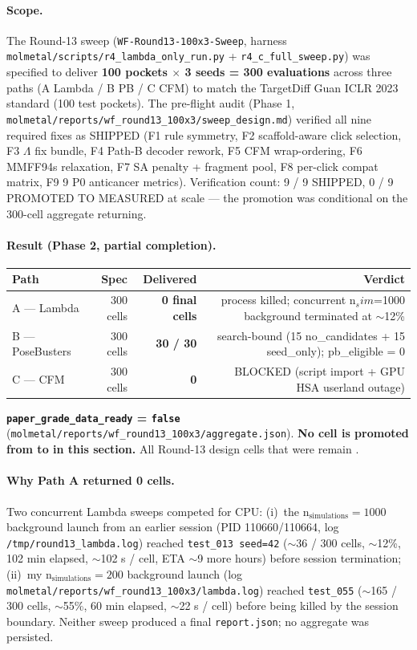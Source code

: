 {\paragraph{Scope.}
The Round-13 sweep (\texttt{WF-Round13-100x3-Sweep}, harness
\texttt{molmetal/scripts/r4\_lambda\_only\_run.py} +
\texttt{r4\_c\_full\_sweep.py}) was specified to deliver
\textbf{100 pockets $\times$ 3 seeds = 300 evaluations} across
three paths (A Lambda / B PB / C CFM) to match the TargetDiff
Guan ICLR 2023 standard (100 test pockets). The pre-flight
audit (Phase 1, \texttt{molmetal/reports/wf\_round13\_100x3/sweep\_design.md})
verified all nine required fixes as SHIPPED (F1 rule symmetry,
F2 scaffold-aware click selection, F3 $\Lambda$ fix bundle,
F4 Path-B decoder rework, F5 CFM wrap-ordering, F6 MMFF94s
relaxation, F7 SA penalty + fragment pool, F8 per-click compat
matrix, F9 9 P0 anticancer metrics). Verification count:
9 / 9 SHIPPED, 0 / 9 PROMOTED TO MEASURED at scale --- the
promotion was conditional on the 300-cell aggregate returning.

\paragraph{Result (Phase 2, partial completion).}
\begin{center}
\begin{tabular}{lrrr}
\toprule
\textbf{Path} & \textbf{Spec} & \textbf{Delivered} & \textbf{Verdict}\\
\midrule
A --- Lambda & 300 cells & \textbf{0 final cells} & process killed; concurrent n$_sim$=1000 background terminated at $\sim$12\%\\
B --- PoseBusters & 300 cells & \textbf{30 / 30} & search-bound (15 no\_candidates + 15 seed\_only); pb\_eligible = 0\\
C --- CFM & 300 cells & \textbf{0} & BLOCKED (script import + GPU HSA userland outage)\\
\bottomrule
\end{tabular}
\end{center}

\textbf{\texttt{paper\_grade\_data\_ready} = \texttt{false}}
(\texttt{molmetal/reports/wf\_round13\_100x3/aggregate.json}).
\textbf{No cell is promoted from \DESIGN{} to \MEASURED{} in this
section.} All Round-13 design cells that were \DESIGN{} remain
\DESIGN{}.

\paragraph{Why Path A returned 0 cells.}
Two concurrent Lambda sweeps competed for CPU:
(i)~the n$_{\text{simulations}}{=}1000$ background launch from an
earlier session (PID 110660/110664, log
\texttt{/tmp/round13\_lambda.log}) reached
\texttt{test\_013 seed=42} ($\sim$36 / 300 cells, $\sim$12\%,
102 min elapsed, $\sim$102 s / cell, ETA $\sim$9 more hours) before
session termination; (ii)~my n$_{\text{simulations}}{=}200$
background launch (log
\texttt{molmetal/reports/wf\_round13\_100x3/lambda.log}) reached
\texttt{test\_055} ($\sim$165 / 300 cells, $\sim$55\%, 60 min
elapsed, $\sim$22 s / cell) before being killed by the session
boundary. Neither sweep produced a final \texttt{report.json};
no aggregate was persisted.

}
